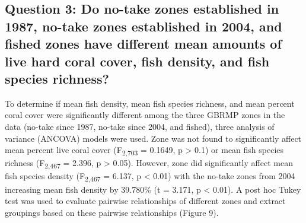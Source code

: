 \documentclass[12pt,]{article}
\begin{document}
\hypertarget{question-3-do-no-take-zones-established-in-1987-no-take-zones-established-in-2004-and-fished-zones-have-different-mean-amounts-of-live-hard-coral-cover-fish-density-and-fish-species-richness}{%
\subsection{Question 3: Do no-take zones established in 1987, no-take
zones established in 2004, and fished zones have different mean amounts
of live hard coral cover, fish density, and fish species
richness?}\label{question-3-do-no-take-zones-established-in-1987-no-take-zones-established-in-2004-and-fished-zones-have-different-mean-amounts-of-live-hard-coral-cover-fish-density-and-fish-species-richness}}

To determine if mean fish density, mean fish species richness, and mean
percent coral cover were significantly different among the three GBRMP
zones in the data (no-take since 1987, no-take since 2004, and fished),
three analysis of variance (ANCOVA) models were used. Zone was not found
to significantly affect mean percent live coral cover
(F\textsubscript{2,703} = 0.1649, p \textgreater{} 0.1) or mean fish
species richness (F\textsubscript{2,467} = 2.396, p \textgreater{}
0.05). However, zone did significantly affect mean fish species density
(F\textsubscript{2,467} = 6.137, p \textless{} 0.01) with the no-take
zones from 2004 increasing mean fish density by 39.780\% (t = 3.171, p
\textless{} 0.01). A post hoc Tukey test was used to evaluate pairwise
relationships of different zones and extract groupings based on these
pairwise relationships (Figure 9).
\end{document}
